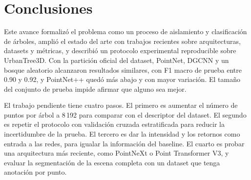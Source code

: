 \documentclass[preprint,12pt]{elsarticle}
\begin{document}
\section*{Conclusiones}

Este avance formalizó el problema como un proceso de aislamiento y clasificación de árboles, amplió el estado del arte con trabajos recientes sobre arquitecturas, datasets y métricas, y describió un protocolo experimental reproducible sobre UrbanTree3D. Con la partición oficial del dataset, PointNet, DGCNN y un bosque aleatorio alcanzaron resultados similares, con F1 macro de prueba entre 0.90 y 0.92, y PointNet++ quedó más abajo y con mayor variación. El tamaño del conjunto de prueba impide afirmar que alguno sea mejor.

El trabajo pendiente tiene cuatro pasos. El primero es aumentar el número de puntos por árbol a 8\,192 para comparar con el descriptor del dataset. El segundo es repetir el protocolo con validación cruzada estratificada para reducir la incertidumbre de la prueba. El tercero es dar la intensidad y los retornos como entrada a las redes, para igualar la información del baseline. El cuarto es probar una arquitectura más reciente, como PointNeXt o Point Transformer V3, y evaluar la segmentación de la escena completa con un dataset que tenga anotación por punto.



\end{document}

